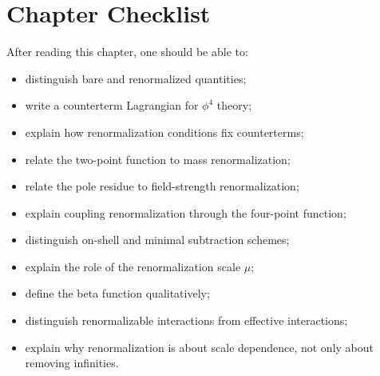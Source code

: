 \section{Chapter Checklist}

After reading this chapter, one should be able to:
\begin{itemize}
    \item distinguish bare and renormalized quantities;
    \item write a counterterm Lagrangian for \(\phi^4\) theory;
    \item explain how renormalization conditions fix counterterms;
    \item relate the two-point function to mass renormalization;
    \item relate the pole residue to field-strength renormalization;
    \item explain coupling renormalization through the four-point function;
    \item distinguish on-shell and minimal subtraction schemes;
    \item explain the role of the renormalization scale \(\mu\);
    \item define the beta function qualitatively;
    \item distinguish renormalizable interactions from effective interactions;
    \item explain why renormalization is about scale dependence, not only about
    removing infinities.
\end{itemize}
